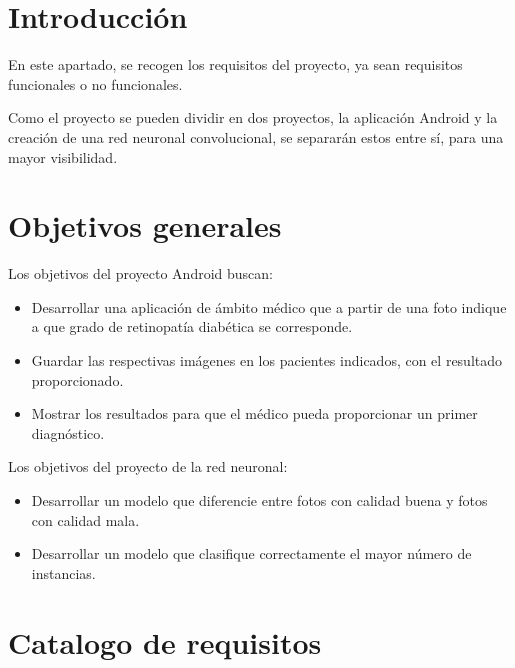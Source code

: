 
\section{Introducción}

En este apartado, se recogen los requisitos del proyecto, ya sean requisitos funcionales o no funcionales.

Como el proyecto se pueden dividir en dos proyectos, la aplicación Android y la creación de una red neuronal convolucional, se separarán estos entre sí, para una mayor visibilidad.

\section{Objetivos generales}

Los objetivos del proyecto Android buscan:

\begin{itemize}
    \item Desarrollar una aplicación de ámbito médico que a partir de una foto indique a que grado de retinopatía diabética se corresponde.
    \item Guardar las respectivas imágenes en los pacientes indicados, con el resultado proporcionado.
    \item Mostrar los resultados para que el médico pueda proporcionar un primer diagnóstico.
\end{itemize}

Los objetivos del proyecto de la red neuronal:

\begin{itemize}
    \item Desarrollar un modelo que diferencie entre fotos con calidad buena y fotos con calidad mala.
    \item Desarrollar un modelo que clasifique correctamente el mayor número de instancias.
\end{itemize}

\section{Catalogo de requisitos}

